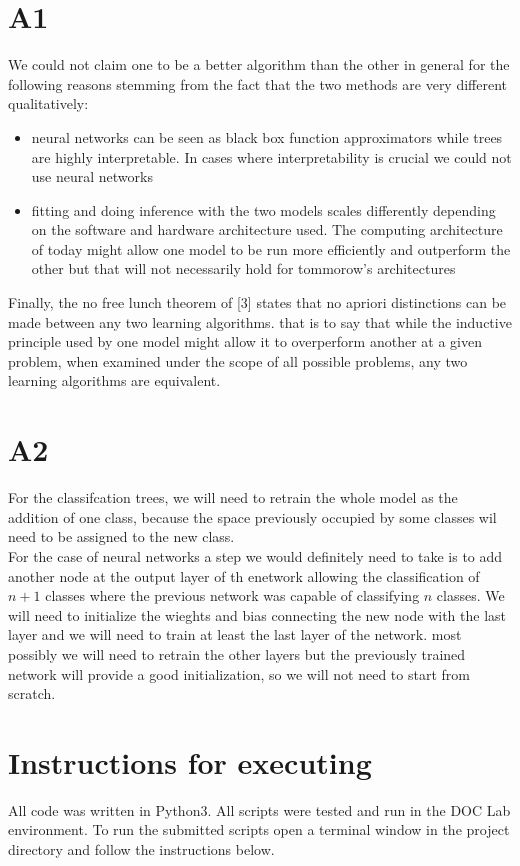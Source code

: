 \documentclass[12pt,twoside]{article}
\begin{document}
\newpage
\section{A1}
We could not claim one to be a better algorithm than the other in general for the following reasons stemming from the fact that the two methods are very different qualitatively:
\begin{itemize}
\item neural networks can be seen as black box function approximators while trees are highly interpretable. In cases where interpretability is crucial we could not use neural networks
\item fitting and doing inference with the two models scales differently depending on the software and hardware architecture used. The computing architecture of today might allow one model to be run more efficiently and outperform the other but that will not necessarily hold for tommorow's architectures
\end{itemize}
Finally, the no free lunch theorem of [3] states that no apriori distinctions can be made between any two learning algorithms. that is to say that while the inductive principle used by one model might allow it to overperform another at a given problem, when examined under the scope of all possible problems, any two learning algorithms are equivalent.


\section{A2}

For the classifcation trees, we will need to retrain the whole model as the addition of one class, because the space previously occupied by some classes wil need to be assigned to the new class.\\

For the case of neural networks a step we would definitely need to take is to add another node at the output layer of th enetwork allowing the classification of $n+1$ classes where the previous network was capable of classifying $n$ classes. We will need to initialize the wieghts and bias connecting the new node with the last layer and we will need to train at least the last layer of the network. most possibly we will need to retrain the other layers but the previously trained network will provide a good initialization, so we will not need to start from scratch.


\newpage
\section{Instructions for executing}
All code was written in Python3. All scripts were tested and run in the DOC Lab environment. To run the submitted scripts open a terminal window in the project directory and follow the instructions below.\\
\end{document}
